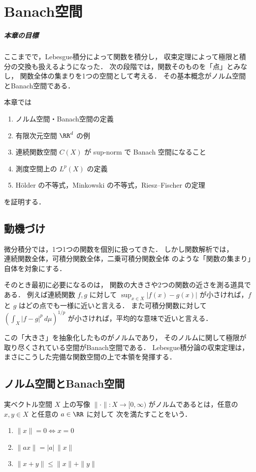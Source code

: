 \setcounter{chapter}{11}
\chapter{Banach空間}

\paragraph{本章の目標}
ここまでで，Lebesgue積分によって関数を積分し，
収束定理によって極限と積分の交換も扱えるようになった．
次の段階では，関数そのものを「点」とみなし，
関数全体の集まりを1つの空間として考える．
その基本概念がノルム空間とBanach空間である．

本章では
\begin{enumerate}
    \item ノルム空間・Banach空間の定義
    \item 有限次元空間 $\RR^d$ の例
    \item 連続関数空間 $C(X)$ が sup-norm で Banach 空間になること
    \item 測度空間上の $L^p(X)$ の定義
    \item Hölder の不等式，Minkowski の不等式，Riesz--Fischer の定理
\end{enumerate}
を証明する．

\section{動機づけ}

微分積分では，1つ1つの関数を個別に扱ってきた．
しかし関数解析では，
$\text{連続関数全体}$，$\text{可積分関数全体}$，$\text{二乗可積分関数全体}$
のような「関数の集まり」自体を対象にする．

そのとき最初に必要になるのは，
関数の大きさや2つの関数の近さを測る道具である．
例えば連続関数 $f,g$ に対して
$\sup_{x\in X}|f(x)-g(x)|$ が小さければ，$f$ と $g$ はどの点でも一様に近いと言える．
また可積分関数に対して
$\left(\int_X |f-g|^p\,d\mu\right)^{1/p}$ が小さければ，平均的な意味で近いと言える．

この「大きさ」を抽象化したものがノルムであり，
そのノルムに関して極限が取り尽くされている空間がBanach空間である．
Lebesgue積分論の収束定理は，
まさにこうした完備な関数空間の上で本領を発揮する．

\section{ノルム空間とBanach空間}

\begin{definition}[ノルム]
実ベクトル空間 $X$ 上の写像 $\|\cdot\|:X\to [0,\infty)$ がノルムであるとは，任意の $x,y\in X$ と任意の $a\in\RR$ に対して
次を満たすことをいう．
\begin{enumerate}
    \item $\|x\|=0 \iff x=0$
    \item $\|ax\|=|a|\,\|x\|$
    \item $\|x+y\|\le \|x\|+\|y\|$
\end{enumerate}
\end{definition}

